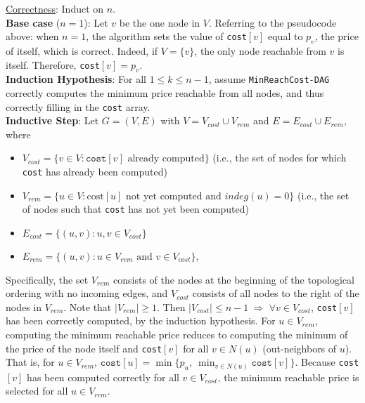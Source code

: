 \documentclass[twoside,11pt]{homework}
\begin{document}
\begin{enumerate}[\bf (a)]
\noindent
\underline{Correctness}: Induct on $n$. \\
\noindent
\textbf{Base case} ($n = 1$):  Let $v$ be the one node in $V$.  Referring to the pseudocode above: when $n=1$, the algorithm sets the value of  \texttt{cost}$[v]$ equal to $p_v$, the price of itself, which is correct. Indeed,  if $V = \{v\}$,  the only node reachable from $v$ is itself.  Therefore,  \texttt{cost}$[v] = p_v$.  \\[0.4em]
\textbf{Induction Hypothesis}: For all $1\leq k \leq n-1$, assume \texttt{MinReachCost-DAG} correctly computes the minimum price reachable from all nodes, and thus correctly filling in the \texttt{cost} array.  \\[0.4em]
\textbf{Inductive Step}:  Let $G = (V, E)$ with $V = V_{cost} \cup V_{rem}$ and $E = E_{cost} \cup E_{rem}$, where 
\begin{itemize}
\item $V_{cost} = \{v \in V : \texttt{cost}[v] \text{  already computed}\}$ (i.e., the set of nodes for which \texttt{cost} has already been computed)  
\item $V_{rem} = \{u \in V : \text{cost}[u] \text{ not yet computed and } indeg(u) = 0\}$ (i.e., the set of nodes such that \texttt{cost} has not yet been computed)
\item $E_{cost} = \{(u,v) : u, v \in V_{cost} \}$
\item $E_{rem} = \{(u,v) : u \in V_{rem} \text{ and } v \in V_{cost} \}$,
\end{itemize}

Specifically,  the set $V_{rem}$ consists of the nodes at the beginning of the topological ordering with no incoming edges, and $V_{cost}$ consists of all nodes to the right of the nodes in $V_{rem}$.  Note that $|V_{rem}| \geq 1$.  Then $|V_{cost}| \leq n-1 \ \Longrightarrow$ $\forall v \in V_{cost}$,   \texttt{cost}$[v]$ has been correctly computed,  by the induction hypothesis.  For $u \in V_{rem}$,  computing the minimum reachable price reduces to computing the minimum of the price of the node itself and \texttt{cost}$[v]$ for all $v \in N(u)$ (out-neighbors of $u$).  That is,  for $u \in V_{rem}$,  $\texttt{cost}[u] = \min\{p_u ,  \ \min_{v \in N(u)}\texttt{cost}[v]\}$.  Because \texttt{cost}$[v]$ has been computed correctly for all $v \in V_{cost}$,  the minimum reachable price is selected for all $u \in V_{rem}$.  \\



\end{enumerate}
\end{document}
